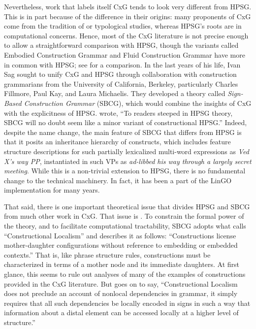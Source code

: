 \documentclass[output=paper,biblatex,babelshorthands,newtxmath,draftmode,colorlinks,citecolor=brown]{langscibook}
\begin{document}
Nevertheless,\label{page-sbcg-start} work that labels itself CxG tends to look very different from HPSG.  This is in part because of the difference in their origins: many proponents of CxG come from the tradition of  or typological studies, whereas HPSG's roots are in computational concerns. Hence, most of the CxG literature is not precise enough to allow a straightforward comparison with HPSG, though the variants called Embodied Construction Grammar and Fluid Construction Grammar have more in common with HPSG; see \cites{MuellerFCG}[Sections~10.6.3--10.6.4]{MuellerGT-Eng4} for a comparison.  In the last years of his life, Ivan Sag sought to unify CxG and HPSG through collaboration with construction grammarians from the University of California, Berkeley, particularly Charles Fillmore, Paul Kay, and Laura Michaelis.  They developed a theory called \emph{Sign-Based Construction Grammar} (SBCG)\indexsbcgstart, which would combine the insights of CxG with the explicitness of HPSG.  \citet[]{Sag2012a} wrote, ``To readers steeped in HPSG theory, SBCG will no doubt seem like a minor variant of constructional HPSG.''  Indeed, despite the name change, the main feature of SBCG that differs from HPSG is that it posits an inheritance hierarchy of constructs, which includes feature structure descriptions for such partially lexicalized multi-word expressions as \emph{Ved X's way PP}, instantiated in such VPs as \textit{ad-libbed his way through a largely secret meeting}.  While\label{evolution:page-sbcg-vs-lingo} this is a non-trivial extension to HPSG, there is no fundamental change to the technical machinery.  In fact, it has been a part of the LinGO implementation for many years.

\largerpage
That said, there is one important theoretical issue that divides HPSG and SBCG from much other work in CxG.  That issue is .  To constrain the formal power of the theory, and to facilitate computational tractability, SBCG adopts what \citet[]{Sag2012a} calls ``Constructional Localism'' and describes it as follows:  ``Constructions license mother-daughter configurations without reference to embedding or embedded contexts.''  That is, like phrase structure rules, constructions must be characterized in terms of a mother node and its immediate daughters.  At first glance, this seems to rule out analyses of many of the examples of constructions provided in the CxG literature.  But  \citet[]{Sag2012a} goes on to say, ``Constructional Localism does not preclude an account of nonlocal dependencies in grammar, it simply requires that all such dependencies be locally encoded in signs in such a way that information about a distal element can be accessed locally at a higher level of structure.''
\end{document}
